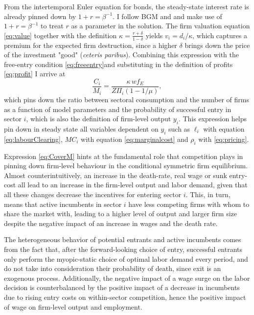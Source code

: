 \documentclass[a4paper,12pt]{article} %
\numberwithin{equation}{section} %
\numberwithin{figure}{section}
\numberwithin{table}{section}
\begin{document}
From the intertemporal Euler equation for bonds, the steady-state interest rate is already pinned down by $1+r = \beta^{-1}$. I follow 
BGM and \textcite{campbell1994inspecting} and make use of $1+r = \beta^{-1}$ to treat $r$ as a parameter in the solution. The firm valuation
equation \eqref{eq:value} together with the definition $\kappa=\frac{r+\delta}{1-\delta}$ yields $v_i = d_i/\kappa$, which captures a premium for
the expected firm destruction, since a higher $\delta$ brings down the price of the investment "good" (\textit{ceteris paribus}). Combining 
this expression with the free-entry condition \eqref{eq:freeentry}and substituting in the definition of profits \eqref{eq:profit} I arrive at  
\begin{equation}
  \frac{C_i}{M_i}=\frac{\kappa\,w f_E}{Z\Pi_i(1-1/\mu)}, \label{eq:CoverM}
\end{equation}
which pins down the ratio between sectoral consumption and the number of firms as a function of model parameters and the probability of successful 
entry in sector $i$, which is also the definition of firm-level output $y_i$. This expression helps pin down in steady state all 
variables dependent on $y_i$ such as $\ell_i$ with equation \eqref{eq:labourClearing}, $MC_i$ with equation \eqref{eq:marginalcost} and 
$\rho_i$ with \eqref{eq:pricing}. 

Expression \eqref{eq:CoverM} hints at the fundamental role that competition plays in pinning down firm-level
behaviour in the conditional symmetric firm equilibrium. Almost counterintuitively, an increase in the death-rate, real wage or sunk entry-cost all lead
to an increase in the firm-level output and labor demand, given that all these changes decrease the incentives for entering sector $i$. This, in turn,
means that active incumbents in sector $i$ have less competing firms with whom to share the market with, leading to a higher level of output and larger
firm size despite the negative impact of an increase in wages and the death rate. 

The heterogeneous behavior of potential entrants and active incumbents comes from the fact that, after the forward-looking choice of entry, 
successful entrants only perform the myopic-static choice of optimal labor demand every period, and do not take into consideration their probability
of death, since exit is an exogenous process. Additionally, the negative impact of a wage surge on the labor decision is counterbalanced by the 
positive impact of a decrease in incumbents due to rising entry costs on within-sector competition, hence the positive impact of wage on firm-level output 
and employment.
\end{document}
